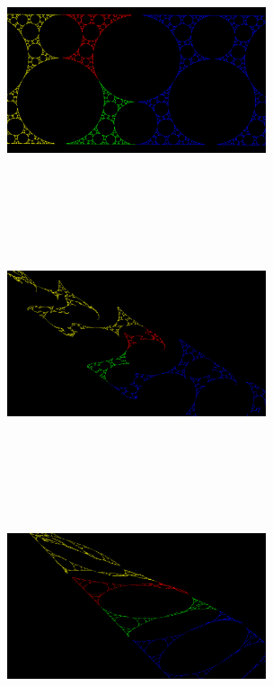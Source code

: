 \begin{figure}[h!tbp]
 \begin{minipage}{0.49\hsize}
  \center
  \includegraphics[width=3in, height=3in, keepaspectratio]{../img/klein/sakugawa1.pdf}
  \subcaption{}
 \end{minipage}
 \hspace*{\fill}
 \begin{minipage}{0.49\hsize}
  \center
  \includegraphics[width=3in, height=3in, keepaspectratio]{../img/klein/sakugawa2.pdf}
  \subcaption{}
 \end{minipage}
 \begin{minipage}{0.49\hsize}
  \center
  \includegraphics[width=3in, height=3in, keepaspectratio]{../img/klein/sakugawa3.pdf}

\end{minipage}
\end{figure}
